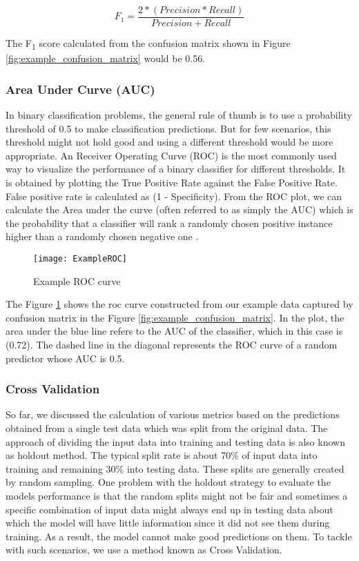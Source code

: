 \documentclass[11pt,openright]{report}
\begin{document}
\begin{equation}
F_{1} = \dfrac{2*(Precision * Recall) }{Precision + Recall} \label{eq:Precision} 
 \end{equation}

The F\textsubscript{1} score calculated from the confusion matrix shown in Figure \ref{fig:example_confusion_matrix} would be 0.56.


\subsubsection{Area Under Curve (AUC)}

In binary classification problems, the general rule of thumb is to use a probability threshold of 0.5 to make classification predictions. But for few scenarios, this threshold might not hold good and using a different threshold would be more appropriate. An Receiver Operating Curve (ROC) is the most commonly used way to visualize the performance of a binary classifier for different thresholds. It is obtained by plotting the True Positive Rate against the False Positive Rate. False positive rate is calculated as (1 - Specificity). From the ROC plot, we can calculate the Area under the curve (often referred to as simply the AUC) which is the probability that a classifier will rank a randomly chosen positive instance higher than a randomly chosen negative one \cite{fawcett2006introduction}.


  \begin{figure}[!htbp]
	\centering
	\texttt{[image: ExampleROC]}
	\caption{Example ROC curve}
	\label{fig:example_roc}
\end{figure} 

The Figure \ref{fig:example_roc} shows the roc curve constructed from our example data captured by confusion matrix in the Figure \ref{fig:example_confusion_matrix}. In the plot, the area under the blue line refers to the AUC of the classifier, which in this case is (0.72). The dashed line in the diagonal represents the ROC curve of a random predictor whose AUC is 0.5.

\subsubsection{Cross Validation}
So far, we discussed the calculation of various metrics based on the predictions obtained from a single test data which was split from the original data. The approach of dividing the input data into training and testing data is also known as holdout method. The typical split rate is about 70\% of input data into training and remaining 30\% into testing data. These splits are generally created by random sampling. One problem with the holdout strategy to evaluate the models performance is that the random splits might not be fair and sometimes a specific combination of input data might always end up in testing data about which the model will have little information since it did not see them during training. As a result, the model cannot make good predictions on them. To tackle with such scenarios, we use a method known as Cross Validation. 
\end{document}
